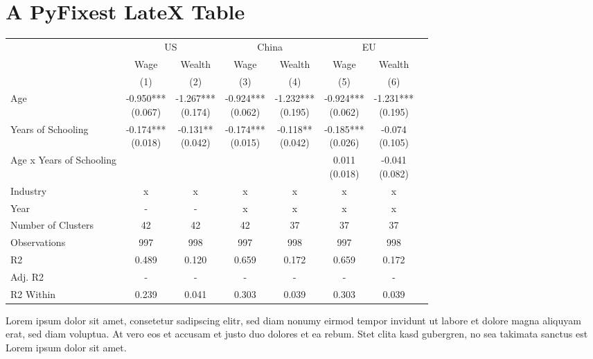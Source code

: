 \documentclass{article}%
\begin{document}
%
\normalsize%
\section{A PyFixest LateX Table}%
\label{sec:APyFixestLateXTable}%


\begin{table}[htbp]%
\renewcommand\cellalign{t}
\begin{threeparttable}
\begin{tabular}{lccccccc}
\toprule
 & \multicolumn{2}{c}{US} & \multicolumn{2}{c}{China} & \multicolumn{2}{c}{EU} \\
\cmidrule(lr){2-3} \cmidrule(lr){4-5} \cmidrule(lr){6-7} 
 & Wage & Wealth & Wage & Wealth & Wage & Wealth \\
 & (1) & (2) & (3) & (4) & (5) & (6) \\
\midrule
\addlinespace
Age & \makecell{-0.950*** \\ (0.067)} & \makecell{-1.267*** \\ (0.174)} & \makecell{-0.924*** \\ (0.062)} & \makecell{-1.232*** \\ (0.195)} & \makecell{-0.924*** \\ (0.062)} & \makecell{-1.231*** \\ (0.195)} \\
Years of Schooling & \makecell{-0.174*** \\ (0.018)} & \makecell{-0.131** \\ (0.042)} & \makecell{-0.174*** \\ (0.015)} & \makecell{-0.118** \\ (0.042)} & \makecell{-0.185*** \\ (0.026)} & \makecell{-0.074 \\ (0.105)} \\
Age x Years of Schooling &  &  &  &  & \makecell{0.011 \\ (0.018)} & \makecell{-0.041 \\ (0.082)} \\
\midrule
\addlinespace
Industry & x & x & x & x & x & x \\
Year & - & - & x & x & x & x \\
\midrule
\addlinespace
Number of Clusters & 42 & 42 & 42 & 37 & 37 & 37 \\
Observations & 997 & 998 & 997 & 998 & 997 & 998 \\
R2 & 0.489 & 0.120 & 0.659 & 0.172 & 0.659 & 0.172 \\
Adj. R2 & - & - & - & - & - & - \\
R2 Within & 0.239 & 0.041 & 0.303 & 0.039 & 0.303 & 0.039 \\
\bottomrule
\end{tabular}
\footnotesize Lorem ipsum dolor sit amet, consetetur sadipscing elitr, sed diam nonumy eirmod tempor invidunt ut labore et dolore magna aliquyam erat, sed diam voluptua. At vero eos et accusam et justo duo dolores et ea rebum. Stet clita kasd gubergren, no sea takimata sanctus est Lorem ipsum dolor sit amet.
\end{threeparttable}%
\end{table}

%
\end{document}
